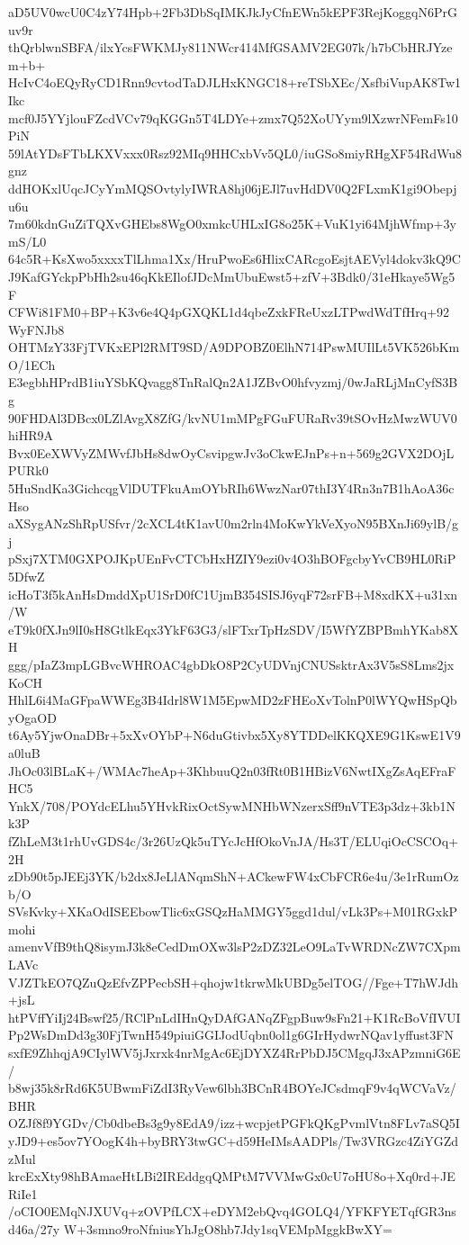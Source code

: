 aD5UV0wcU0C4zY74Hpb+2Fb3DbSqIMKJkJyCfnEWn5kEPF3RejKoggqN6PrGuv9r
thQrblwnSBFA/ilxYcsFWKMJy811NWcr414MfGSAMV2EG07k/h7bCbHRJYzem+b+
HcIvC4oEQyRyCD1Rnn9cvtodTaDJLHxKNGC18+reTSbXEc/XsfbiVupAK8Tw1Ikc
mcf0J5YYjlouFZcdVCv79qKGGn5T4LDYe+zmx7Q52XoUYym9lXzwrNFemFs10PiN
59lAtYDsFTbLKXVxxx0Rsz92MIq9HHCxbVv5QL0/iuGSo8miyRHgXF54RdWu8gnz
ddHOKxlUqcJCyYmMQSOvtylyIWRA8hj06jEJl7uvHdDV0Q2FLxmK1gi9Obepju6u
7m60kdnGuZiTQXvGHEbs8WgO0xmkcUHLxIG8o25K+VuK1yi64MjhWfmp+3ymS/L0
64c5R+KsXwo5xxxxTlLhma1Xx/HruPwoEs6HlixCARcgoEsjtAEVyl4dokv3kQ9C
J9KafGYckpPbHh2su46qKkEIlofJDcMmUbuEwst5+zfV+3Bdk0/31eHkaye5Wg5F
CFWi81FM0+BP+K3v6e4Q4pGXQKL1d4qbeZxkFReUxzLTPwdWdTfHrq+92WyFNJb8
OHTMzY33FjTVKxEPl2RMT9SD/A9DPOBZ0ElhN714PswMUIlLt5VK526bKmO/1ECh
E3egbhHPrdB1iuYSbKQvagg8TnRalQn2A1JZBvO0hfvyzmj/0wJaRLjMnCyfS3Bg
90FHDAl3DBcx0LZlAvgX8ZfG/kvNU1mMPgFGuFURaRv39tSOvHzMwzWUV0hiHR9A
Bvx0EeXWVyZMWvfJbHs8dwOyCsvipgwJv3oCkwEJnPs+n+569g2GVX2DOjLPURk0
5HuSndKa3GichcqgVlDUTFkuAmOYbRIh6WwzNar07thI3Y4Rn3n7B1hAoA36cHso
aXSygANzShRpUSfvr/2cXCL4tK1avU0m2rln4MoKwYkVeXyoN95BXnJi69ylB/gj
pSxj7XTM0GXPOJKpUEnFvCTCbHxHZIY9ezi0v4O3hBOFgcbyYvCB9HL0RiP5DfwZ
icHoT3f5kAnHsDmddXpU1SrD0fC1UjmB354SISJ6yqF72srFB+M8xdKX+u31xn/W
eT9k0fXJn9lI0sH8GtlkEqx3YkF63G3/slFTxrTpHzSDV/I5WfYZBPBmhYKab8XH
ggg/pIaZ3mpLGBvcWHROAC4gbDkO8P2CyUDVnjCNUSsktrAx3V5sS8Lms2jxKoCH
HhlL6i4MaGFpaWWEg3B4Idrl8W1M5EpwMD2zFHEoXvTolnP0lWYQwHSpQbyOgaOD
t6Ay5YjwOnaDBr+5xXvOYbP+N6duGtivbx5Xy8YTDDelKKQXE9G1KswE1V9a0luB
JhOc03lBLaK+/WMAc7heAp+3KhbuuQ2n03fRt0B1HBizV6NwtIXgZsAqEFraFHC5
YnkX/708/POYdcELhu5YHvkRixOctSywMNHbWNzerxSff9nVTE3p3dz+3kb1Nk3P
fZhLeM3t1rhUvGDS4c/3r26UzQk5uTYcJcHfOkoVnJA/Hs3T/ELUqiOcCSCOq+2H
zDb90t5pJEEj3YK/b2dx8JeLlANqmShN+ACkewFW4xCbFCR6e4u/3e1rRumOzb/O
SVsKvky+XKaOdISEEbowTlic6xGSQzHaMMGY5ggd1dul/vLk3Ps+M01RGxkPmohi
amenvVfB9thQ8isymJ3k8eCedDmOXw3lsP2zDZ32LeO9LaTvWRDNcZW7CXpmLAVc
VJZTkEO7QZuQzEfvZPPecbSH+qhojw1tkrwMkUBDg5elTOG//Fge+T7hWJdh+jsL
htPVffYiIj24Bswf25/RClPnLdIHnQyDAfGANqZFgpBuw9sFn21+K1RcBoVfIVUI
Pp2WsDmDd3g30FjTwnH549piuiGGIJodUqbn0ol1g6GIrHydwrNQav1yffust3FN
sxfE9ZhhqjA9CIylWV5jJxrxk4nrMgAc6EjDYXZ4RrPbDJ5CMgqJ3xAPzmniG6E/
b8wj35k8rRd6K5UBwmFiZdI3RyVew6lbh3BCnR4BOYeJCsdmqF9v4qWCVaVz/BHR
OZJf8f9YGDv/Cb0dbeBs3g9y8EdA9/izz+wcpjetPGFkQKgPvmlVtn8FLv7aSQ5I
yJD9+es5ov7YOogK4h+byBRY3twGC+d59HeIMsAADPls/Tw3VRGzc4ZiYGZdzMul
krcExXty98hBAmaeHtLBi2IREddgqQMPtM7VVMwGx0cU7oHU8o+Xq0rd+JERiIe1
/oCIO0EMqNJXUVq+zOVPfLCX+eDYM2ebQvq4GOLQ4/YFKFYETqfGR3nsd46a/27y
W+3smno9roNfniusYhJgO8hb7Jdy1sqVEMpMggkBwXY=
